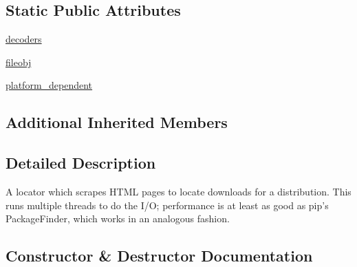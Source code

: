 \subsection*{Static Public Attributes}
\begin{DoxyCompactItemize}
\item 
\hyperlink{classpip_1_1__vendor_1_1distlib_1_1locators_1_1SimpleScrapingLocator_adef1671514a04de04a79b8c21e2b81da}{decoders}
\item 
\hyperlink{classpip_1_1__vendor_1_1distlib_1_1locators_1_1SimpleScrapingLocator_a600b9e7ee74d03d560aa89a38609e607}{fileobj}
\item 
\hyperlink{classpip_1_1__vendor_1_1distlib_1_1locators_1_1SimpleScrapingLocator_ab40f62c6258707e0329e710d7700c086}{platform\+\_\+dependent}
\end{DoxyCompactItemize}
\subsection*{Additional Inherited Members}


\subsection{Detailed Description}
\begin{DoxyVerb}A locator which scrapes HTML pages to locate downloads for a distribution.
This runs multiple threads to do the I/O; performance is at least as good
as pip's PackageFinder, which works in an analogous fashion.
\end{DoxyVerb}
 

\subsection{Constructor \& Destructor Documentation}
\mbox{\label{classpip_1_1__vendor_1_1distlib_1_1locators_1_1SimpleScrapingLocator_a86eb1e08c1ec1fc9e5a3edcf92c923db}} 

